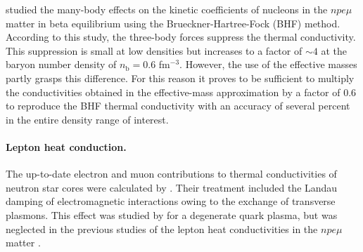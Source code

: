 \documentclass[smallextended]{svjour3}       %
\newcommand{\nb}{n_\mathrm{b}}
\begin{document}
\citet{ShterninBH13} studied the many-body
effects on the kinetic coefficients of nucleons in the
$npe\mu$ matter in beta equilibrium using the
Brueckner-Hartree-Fock (BHF) method. According to this
study, the three-body forces suppress the thermal
conductivity. This suppression is small at low densities but
increases to a factor of $\sim4$ at the baryon number
density of $\nb=0.6$ fm$^{-3}$. However, the use of the
effective masses partly grasps this difference. For this
reason it proves to be sufficient to multiply the
conductivities obtained in the effective-mass approximation
\citep{BaikoHY01} by a factor of 0.6 to reproduce the BHF
thermal conductivity \citep{ShterninBH13} with an accuracy
of several percent in the entire density range of interest.

\paragraph{Lepton heat conduction.}

The up-to-date electron and muon contributions to thermal
conductivities of neutron star cores were calculated by
\citet{ShterninYakovlev07}. Their treatment included the
Landau damping of electromagnetic interactions owing to the
exchange of transverse plasmons. This effect was studied by
\citet{HeiselbergPethick93} for a degenerate quark plasma,
but was neglected in the previous studies of the lepton heat
conductivities in the $npe\mu$ matter
\citep[e.g.,][]{FlowersItoh81,GnedinYakovlev95}.
\end{document}
